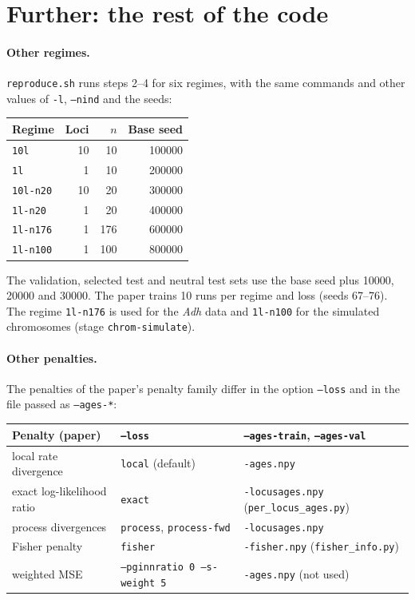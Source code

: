 \documentclass[11pt]{article}
\newcommand{\file}[1]{\texttt{#1}}
\begin{document}
\section{Further: the rest of the code}\label{sec:further}

\paragraph{Other regimes.}
\file{reproduce.sh} runs steps 2--4 for six regimes, with the same
commands and other values of \texttt{-l}, \texttt{--nind} and the seeds:
\begin{center}
\small
\begin{tabular}{@{}lrrr@{}}
\toprule
Regime & Loci & $n$ & Base seed \\
\midrule
\texttt{10l}     & 10 & 10  & 100000 \\
\texttt{1l}      & 1  & 10  & 200000 \\
\texttt{10l-n20} & 10 & 20  & 300000 \\
\texttt{1l-n20}  & 1  & 20  & 400000 \\
\texttt{1l-n176} & 1  & 176 & 600000 \\
\texttt{1l-n100} & 1  & 100 & 800000 \\
\bottomrule
\end{tabular}
\end{center}
The validation, selected test and neutral test sets use the base seed
plus 10000, 20000 and 30000.
The paper trains 10 runs per regime and loss (seeds 67--76).
The regime \texttt{1l-n176} is used for the \emph{Adh} data and
\texttt{1l-n100} for the simulated chromosomes (stage
\texttt{chrom-simulate}).

\paragraph{Other penalties.}
The penalties of the paper's penalty family differ in the option
\texttt{--loss} and in the file passed as \texttt{--ages-*}:
\begin{center}
\small
\begin{tabular}{@{}lll@{}}
\toprule
Penalty (paper) & \texttt{--loss} & \texttt{--ages-train}, \texttt{--ages-val} \\
\midrule
local rate divergence      & \texttt{local} (default) & \file{-ages.npy} \\
exact log-likelihood ratio & \texttt{exact}       & \file{-locusages.npy} (\file{per\_locus\_ages.py}) \\
process divergences        & \texttt{process}, \texttt{process-fwd} & \file{-locusages.npy} \\
Fisher penalty             & \texttt{fisher}      & \file{-fisher.npy} (\file{fisher\_info.py}) \\
weighted MSE               & \texttt{--pginnratio 0 --s-weight 5} & \file{-ages.npy} (not used) \\
\bottomrule
\end{tabular}
\end{center}
\end{document}
